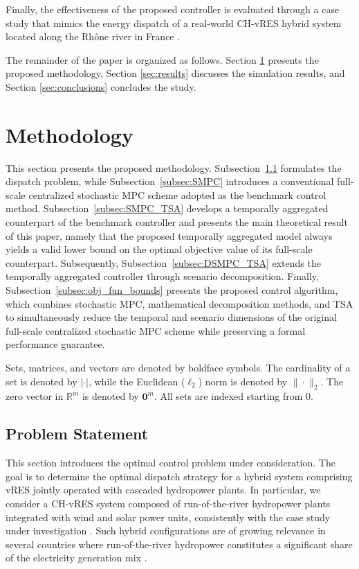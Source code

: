 \documentclass[a4paper,fleqn]{cas-sc}
\begin{document}
Finally, the effectiveness of the proposed controller is evaluated through a case study that mimics the energy dispatch of a real-world CH-vRES hybrid system located along the Rhône river in France \citep{piron2016operating}.

The remainder of the paper is organized as follows.
Section \ref{sec:methodology} presents the proposed methodology,
Section \ref{sec:results} discusses the simulation results,
and Section \ref{sec:conclusions} concludes the study.


\section{Methodology}
\label{sec:methodology}

This section presents the proposed methodology.
Subsection~\ref{subsec:prob_statement} formulates the dispatch problem,
while Subsection~\ref{subsec:SMPC} introduces a conventional full-scale centralized stochastic MPC scheme adopted as the benchmark control method.
Subsection~\ref{subsec:SMPC_TSA} develops a temporally aggregated counterpart of the benchmark controller and presents the main theoretical result of this paper,
namely that the proposed temporally aggregated model always yields a valid lower bound on the optimal objective value of its full-scale counterpart.
Subsequently, Subsection~\ref{subsec:DSMPC_TSA} extends the temporally aggregated controller through scenario decomposition.
Finally, Subsection~\ref{subsec:obj_fun_bounds} presents the proposed control algorithm, which combines stochastic MPC, mathematical decomposition methods, and TSA to simultaneously reduce the temporal and scenario dimensions of the original full-scale centralized stochastic MPC scheme while preserving a formal performance guarantee.

Sets, matrices, and vectors are denoted by boldface symbols.
The cardinality of a set is denoted by $|\cdot|$,
while the Euclidean ($\ell_2$) norm is denoted by $\|\cdot\|_2$.
The zero vector in $\mathbb{R}^m$ is denoted by $\mathbf{0}^m$.
All sets are indexed starting from $0$.

\subsection{Problem Statement}
\label{subsec:prob_statement}

This section introduces the optimal control problem under consideration.
The goal is to determine the optimal dispatch strategy for a hybrid system comprising vRES jointly operated with cascaded hydropower plants.
In particular, we consider a CH-vRES system composed of run-of-the-river hydropower plants integrated with wind and solar power units, consistently with the case study under investigation \citep{santosuosso2025distributed}.
Such hybrid configurations are of growing relevance in several countries where run-of-the-river hydropower constitutes a significant share of the electricity generation mix \citep{IEA2021Hydropower}.
\end{document}

